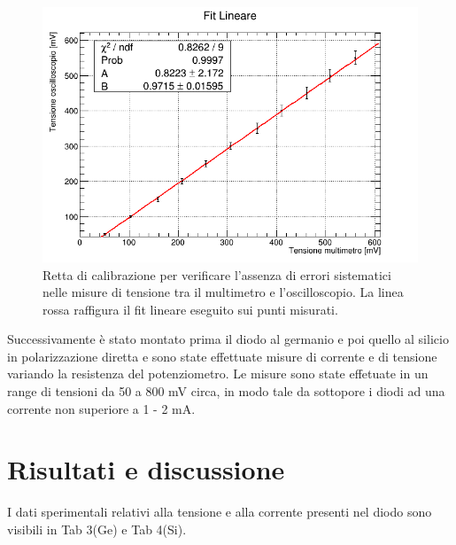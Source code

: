 \documentclass[a4paper,11pt]{article}
\begin{document}
\begin{figure} [h!]
  \centering
  \includegraphics[width=0.7\linewidth]{../analisi dati/calibrazione.png}
  \caption{Retta di calibrazione per verificare l'assenza di errori sistematici nelle misure di tensione tra il multimetro e l'oscilloscopio. La linea rossa raffigura il fit lineare eseguito sui punti misurati.}
\end{figure}


Successivamente è stato montato prima il diodo al germanio e poi quello al silicio in polarizzazione diretta e sono state effettuate misure di corrente e di tensione variando la resistenza del potenziometro. Le misure sono state effetuate in un range di tensioni da 50 a 800 mV circa, in modo tale da sottopore i diodi ad una corrente non superiore a 1 - 2 mA.
\newpage
\section{Risultati e discussione}
I dati sperimentali relativi alla tensione e alla corrente presenti nel diodo sono visibili in Tab 3(Ge) e Tab 4(Si).
\end{document}
